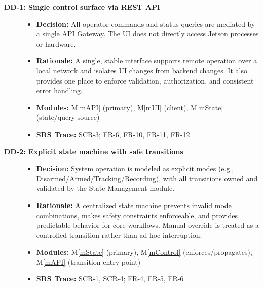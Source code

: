 \documentclass[12pt, titlepage]{article}
\newcommand{\mref}[1]{M\ref{#1}}
\begin{document}
\begin{description}

  \item[\textbf{DD-1: Single control surface via REST API}] \leavevmode
        \begin{itemize}
          \item \textbf{Decision:} All operator commands and status queries are mediated by a single
                API Gateway. The UI does not directly access Jetson processes or hardware.
          \item \textbf{Rationale:} A single, stable interface supports remote operation over a local
                network and isolates UI changes from backend changes. It also provides one place to
                enforce validation, authorization, and consistent error handling.
          \item \textbf{Modules:} \mref{mAPI} (primary), \mref{mUI} (client), \mref{mState} (state/query source)
          \item \textbf{SRS Trace:} SCR-3; FR-6, FR-10, FR-11, FR-12
        \end{itemize}

  \item[\textbf{DD-2: Explicit state machine with safe transitions}] \leavevmode
        \begin{itemize}
          \item \textbf{Decision:} System operation is modeled as explicit modes (e.g., Disarmed/Armed/Tracking/Recording),
                with all transitions owned and validated by the State Management module.
          \item \textbf{Rationale:} A centralized state machine prevents invalid mode combinations, makes
                safety constraints enforceable, and provides predictable behavior for core workflows.
                Manual override is treated as a controlled transition rather than ad-hoc interruption.
          \item \textbf{Modules:} \mref{mState} (primary), \mref{mControl} (enforces/propagates), \mref{mAPI} (transition entry point)
          \item \textbf{SRS Trace:} SCR-1, SCR-4; FR-4, FR-5, FR-6
        \end{itemize}


\end{description}
\end{document}
